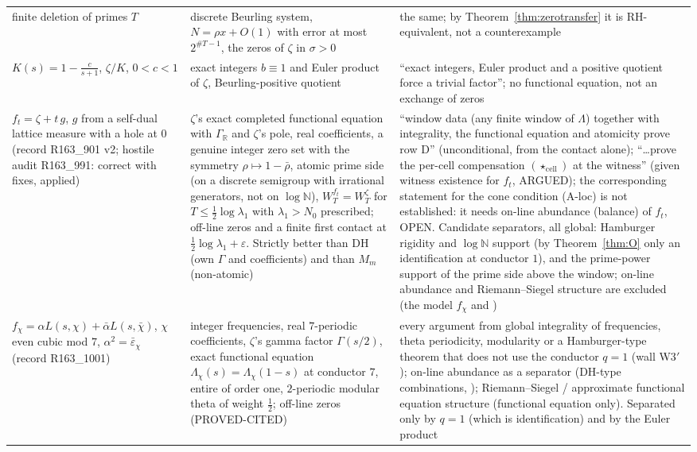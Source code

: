 \documentclass[11pt]{amsart}
\theoremstyle{definition}
\theoremstyle{remark}
\begin{document}
\begin{table}[ht]
\begin{tabularx}{\textwidth}{@{}p{3.3cm}p{4.0cm}Y@{}}
finite deletion of primes $T$ & discrete Beurling system, $N=\rho x+O(1)$ with error at most $2^{\#T-1}$, the zeros of $\zeta$ in $\sigma>0$ & the same; by Theorem~\ref{thm:zerotransfer} it is RH-equivalent, not a counterexample \\
$K(s)=1-\frac c{s+1}$, $\zeta/K$, $0<c<1$ & exact integers $b\equiv1$ and Euler product of $\zeta$, Beurling-positive quotient & ``exact integers, Euler product and a positive quotient force a trivial factor''; no functional equation, not an exchange of zeros \\
$f_t=\zeta+t\,g$, $g$ from a self-dual lattice measure with a hole at $0$ (record R163\_901 v2; hostile audit R163\_991: correct with fixes, applied) & $\zeta$'s exact completed functional equation with $\Gamma_{\mathbb R}$ and $\zeta$'s pole, real coefficients, a genuine integer zero set with the symmetry $\rho\mapsto1-\bar\rho$, atomic prime side (on a discrete semigroup with irrational generators, not on $\log\mathbb N$), $W^{f_t}_T=W^\zeta_T$ for $T\le\frac12\log\lambda_1$ with $\lambda_1>N_0$ prescribed; off-line zeros and a finite first contact at $\frac12\log\lambda_1+\varepsilon$. Strictly better than DH (own $\Gamma$ and coefficients) and than $M_m$ (non-atomic) & ``window data (any finite window of $\Lambda$) together with integrality, the functional equation and atomicity prove row D'' (unconditional, from the contact alone); ``\dots prove the per-cell compensation $(\star_{\mathrm{cell}})$ at the witness'' (given witness existence for $f_t$, ARGUED); the corresponding statement for the cone condition (A-loc) is not established: it needs on-line abundance (balance) of $f_t$, OPEN. Candidate separators, all global: Hamburger rigidity and $\log\mathbb N$ support (by Theorem~\ref{thm:O} only an identification at conductor $1$), and the prime-power support of the prime side above the window; on-line abundance and Riemann--Siegel structure are excluded (the model $f_\chi$ and \cite{BombieriHejhal1995}) \\
$f_\chi=\alpha L(s,\chi)+\bar\alpha L(s,\bar\chi)$, $\chi$ even cubic mod $7$, $\alpha^2=\bar\varepsilon_\chi$ (record R163\_1001) & integer frequencies, real $7$-periodic coefficients, $\zeta$'s gamma factor $\Gamma(s/2)$, exact functional equation $\Lambda_\chi(s)=\Lambda_\chi(1-s)$ at conductor $7$, entire of order one, $2$-periodic modular theta of weight $\frac12$; off-line zeros \cite{KaczorowskiKulas2007,SaiasWeingartner2009} (PROVED-CITED) & every argument from global integrality of frequencies, theta periodicity, modularity or a Hamburger-type theorem that does not use the conductor $q=1$ (wall W3$'$); on-line abundance as a separator (DH-type combinations, \cite{BombieriHejhal1995}); Riemann--Siegel / approximate functional equation structure (functional equation only). Separated only by $q=1$ (which is identification) and by the Euler product \\

\end{tabularx}
\end{table}
\end{document}
